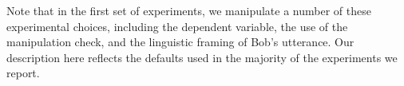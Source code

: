 Note that in the first set of experiments, we manipulate a number of these experimental choices, including the dependent variable, the use of the manipulation check, and the linguistic framing of Bob's utterance. Our description here reflects the defaults used in the majority of the experiments we report. 






